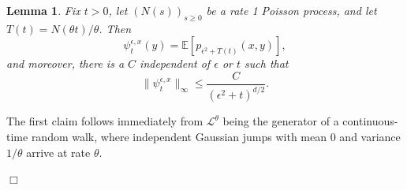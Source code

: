 \documentclass[12pt]{article}
\newenvironment {proof}{{\noindent\bf Proof }}{\hfill $\Box$ \medskip}
\newtheorem{lemma}[theorem]{Lemma}
\newcommand{\IE}{\mathbb E}
\begin{document}
\begin{lemma} \label{PsiBoundHS}
    Fix $t>0$,
    let $(N(s))_{s \ge 0}$ be a rate 1 Poisson process,
    and let $T(t) = N(\theta t) / \theta$.
    Then
    \[
        \psi^{\epsilon,x}_t(y)
        =
        \IE\left[ p_{\epsilon^2+T(t)}(x,y)\right],
    \]
    and moreover, there is a $C$ independent of $\epsilon$ or $t$ such that
    \[
        \| \psi^{\epsilon,x}_t \|_\infty
        \leq
        \frac{C}{(\epsilon^2 + t)^{d/2}} .
    \]
\end{lemma}

\begin{proof}
    The first claim follows immediately from $\mathcal{L}^\theta$ being the generator
    of a continuous-time random walk,
    where independent Gaussian jumps with mean $0$ and variance $1/\theta$
    arrive at rate $\theta$.


\end{proof}
\end{document}
